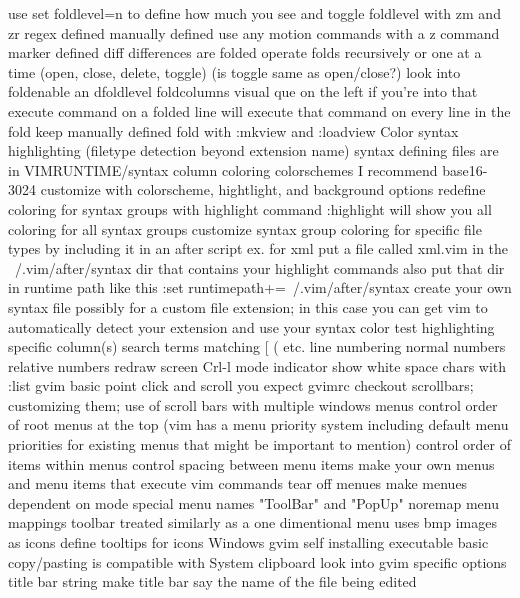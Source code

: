 \documentclass[12pt]{book}
\begin{document}
{        use set foldlevel=n to define how much you see and toggle foldlevel with zm and zr
      regex defined
      manually defined
        use any motion commands with a z command
      marker defined
      diff differences are folded
    operate folds recursively or one at a time (open, close, delete, toggle) (is toggle same as open/close?)
    look into foldenable an dfoldlevel
    foldcolumns visual que on the left if you're into that
    execute command on a folded line will execute that command on every line in the fold
    keep manually defined fold with :mkview and :loadview
  Color
    syntax highlighting (filetype detection beyond extension name)
      syntax defining files are in VIMRUNTIME/syntax
    column coloring
    colorschemes
      I recommend base16-3024
      customize with colorscheme, hightlight, and background options
      redefine coloring for syntax groups with highlight command
      :highlight will show you all coloring for all syntax groups
      customize syntax group coloring for specific file types by including it in an after script
        ex. for xml put a file called xml.vim in the ~/.vim/after/syntax dir that contains your highlight commands
        also put that dir in runtime path like this :set runtimepath+=~/.vim/after/syntax
      create your own syntax file
        possibly for a custom file extension; in this case you can get vim to automatically detect your extension and use your syntax
    color test
  highlighting
    specific column(s)
    search terms
    matching { [ ( etc.
  line numbering
    normal numbers
    relative numbers
  redraw screen Crl-l
  mode indicator
  show white space chars with :list
  gvim
    basic point click and scroll you expect
    gvimrc
    checkout scrollbars; customizing them; use of scroll bars with multiple windows
    menus
      control order of root menus at the top (vim has a menu priority system including default menu priorities for existing menus that might be important to mention)
      control order of items within menus
      control spacing between menu items
      make your own menus and menu items that execute vim commands
      tear off menues
      make menues dependent on mode
      special menu names "ToolBar" and "PopUp"
      noremap menu mappings
    toolbar
      treated similarly as a one dimentional menu
      uses bmp images as icons
      define tooltips for icons
    Windows gvim
      self installing executable
      basic copy/pasting is compatible with System clipboard
    look into gvim specific options
    title bar string
      make title bar say the name of the file being edited
}}
\end{document}
